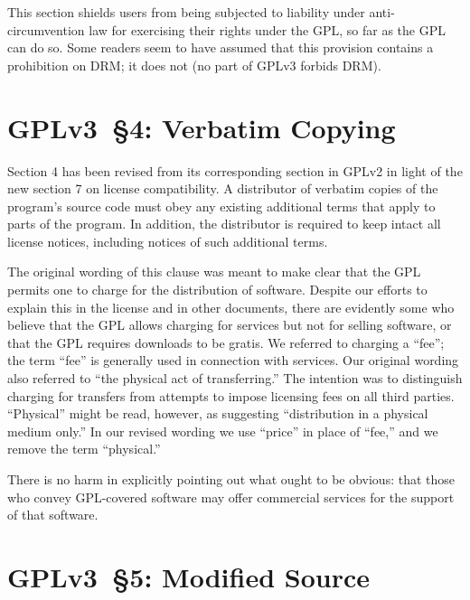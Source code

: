 This section shields users from being subjected to liability under
anti-circumvention law for exercising their rights under the GPL, so far as
the GPL can do so.  Some readers seem to have assumed that this provision
contains a prohibition on DRM; it does not (no part of GPLv3 forbids DRM).

\section{GPLv3~\S4: Verbatim Copying}


Section 4 has been revised from its corresponding section in GPLv2 in light
of the new section 7 on license compatibility. A distributor of verbatim
copies of the program's source code must obey any existing additional terms
that apply to parts of the program. In addition, the distributor is required
to keep intact all license notices, including notices of such additional
terms.


The original wording of this clause was meant to
make clear that the GPL permits one to charge for the distribution of
software.  Despite our efforts to explain this in the license and in
other documents, there are evidently some who believe that the GPL
allows charging for services but not for selling software, or that the
GPL requires downloads to be gratis.  We referred to charging a ``fee'';
the term ``fee'' is generally used in connection with services.  Our
original wording also referred to ``the physical act of transferring.''
The intention was to distinguish charging for transfers from attempts to
impose licensing fees on all third parties.  ``Physical'' might be read,
however, as suggesting ``distribution in a physical medium only.''  In
our revised wording we use ``price'' in place of ``fee,'' and we remove
the term ``physical.''


There is no harm in explicitly pointing out what ought to be obvious: that
those who convey GPL-covered software may offer commercial services for the
support of that software.

\section{GPLv3~\S5: Modified Source}

